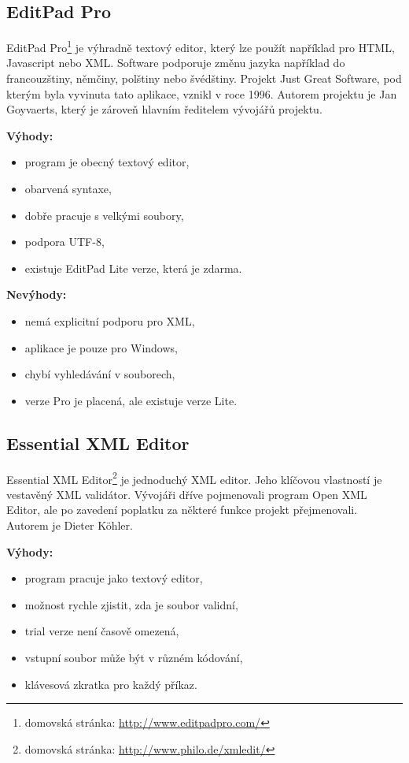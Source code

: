         \subsection{EditPad Pro}
            EditPad Pro\footnote{domovská stránka: \url{http://www.editpadpro.com/}} je výhradně textový editor, který lze použít například pro HTML, Javascript nebo XML. Software podporuje změnu jazyka například do francouzštiny, němčiny, polštiny nebo švédštiny. Projekt Just Great Software, pod kterým byla vyvinuta tato aplikace, vznikl v roce 1996. Autorem projektu je Jan Goyvaerts, který je zároveň hlavním ředitelem vývojářů projektu.

            \textbf{Výhody:}
                \begin{itemize}
                    \item program je obecný textový editor,
                    \item obarvená syntaxe,
                    \item dobře pracuje s velkými soubory,
                    \item podpora UTF-8,
                    \item existuje EditPad Lite verze, která je zdarma.
                \end{itemize}
                
            \textbf{Nevýhody:}
                \begin{itemize}
                    \item nemá explicitní podporu pro XML,
                    \item aplikace je pouze pro Windows,
                    \item chybí vyhledávání v souborech,
                    \item verze Pro je placená, ale existuje verze Lite.
                \end{itemize}
                
        \subsection{Essential XML Editor}
            Essential XML Editor\footnote{domovská stránka: \url{http://www.philo.de/xmledit/}} je jednoduchý XML editor. Jeho klíčovou vlastností je vestavěný XML validátor. Vývojáři dříve pojmenovali program Open XML Editor, ale po zavedení poplatku za některé funkce projekt přejmenovali. Autorem je Dieter Köhler. 
            
            \textbf{Výhody:}
                \begin{itemize}
                    \item program pracuje jako textový editor,
                    \item možnost rychle zjistit, zda je soubor validní,
                    \item trial verze není časově omezená,
                    \item vstupní soubor může být v různém kódování,
                    \item klávesová zkratka pro každý příkaz.
                \end{itemize}
                
